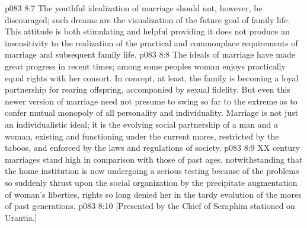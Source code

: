 \vs p083 8:7 The youthful idealization of marriage should not, however, be discouraged; such dreams are the visualization of the future goal of family life. This attitude is both stimulating and helpful providing it does not produce an insensitivity to the realization of the practical and commonplace requirements of marriage and subsequent family life.
\vs p083 8:8 The ideals of marriage have made great progress in recent times; among some peoples woman enjoys practically equal rights with her consort. In concept, at least, the family is becoming a loyal partnership for rearing offspring, accompanied by sexual fidelity. But even this newer version of marriage need not presume to swing so far to the extreme as to confer mutual monopoly of all personality and individuality. Marriage is not just an individualistic ideal; it is the evolving social partnership of a man and a woman, existing and functioning under the current mores, restricted by the taboos, and enforced by the laws and regulations of society.
\vs p083 8:9 XX century marriages stand high in comparison with those of past ages, notwithstanding that the home institution is now undergoing a serious testing because of the problems so suddenly thrust upon the social organization by the precipitate augmentation of woman’s liberties, rights so long denied her in the tardy evolution of the mores of past generations.
\vsetoff
\vs p083 8:10 [Presented by the Chief of Seraphim stationed on Urantia.]
